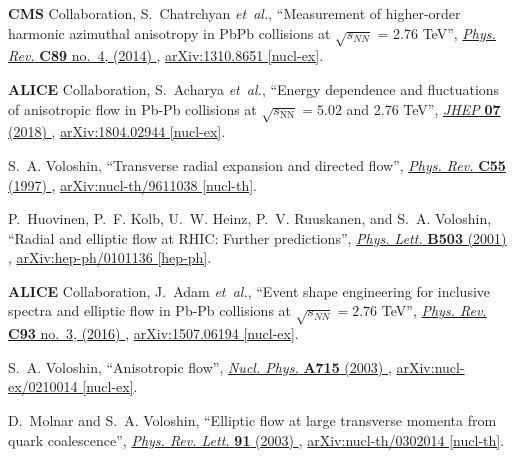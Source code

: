 \documentclass[ALICE,manyauthors]{cernphprep}
\providecommand{\DIFdelend}{} %
\begin{document}
\begin{thebibliography}{10}
\DIFdelend {}
{\bfseries CMS} Collaboration, S.~Chatrchyan {\em et~al.}, ``{Measurement of
  higher-order harmonic azimuthal anisotropy in PbPb collisions at
  $\sqrt{s_{NN}}$ = 2.76 TeV}'',
  \href{http://dx.doi.org/10.1103/PhysRevC.89.044906}{{\em Phys. Rev.}
  {\bfseries C89} no.~4, (2014) },
\href{http://arxiv.org/abs/1310.8651}{{\ttfamily arXiv:1310.8651 [nucl-ex]}}.

{\bfseries ALICE} Collaboration, S.~Acharya {\em et~al.}, ``{Energy dependence
  and fluctuations of anisotropic flow in Pb-Pb collisions at $
  \sqrt{s_{\mathrm{NN}}}=5.02 $ and 2.76 TeV}'',
  \href{http://dx.doi.org/10.1007/JHEP07(2018)103}{{\em JHEP} {\bfseries 07}
  (2018) },
\href{http://arxiv.org/abs/1804.02944}{{\ttfamily arXiv:1804.02944 [nucl-ex]}}.

S.~A. Voloshin, ``{Transverse radial expansion and directed flow}'',
  \href{http://dx.doi.org/10.1103/PhysRevC.55.R1630}{{\em Phys. Rev.}
  {\bfseries C55} (1997) },
\href{http://arxiv.org/abs/nucl-th/9611038}{{\ttfamily arXiv:nucl-th/9611038
  [nucl-th]}}.

P.~Huovinen, P.~F. Kolb, U.~W. Heinz, P.~V. Ruuskanen, and S.~A. Voloshin,
  ``{Radial and elliptic flow at RHIC: Further predictions}'',
  \href{http://dx.doi.org/10.1016/S0370-2693(01)00219-2}{{\em Phys. Lett.}
  {\bfseries B503} (2001) },
\href{http://arxiv.org/abs/hep-ph/0101136}{{\ttfamily arXiv:hep-ph/0101136
  [hep-ph]}}.

{\bfseries ALICE} Collaboration, J.~Adam {\em et~al.}, ``{Event shape
  engineering for inclusive spectra and elliptic flow in Pb-Pb collisions at
  $\sqrt{s_{NN}} = 2.76$ TeV}'',
  \href{http://dx.doi.org/10.1103/PhysRevC.93.034916}{{\em Phys. Rev.}
  {\bfseries C93} no.~3, (2016) },
\href{http://arxiv.org/abs/1507.06194}{{\ttfamily arXiv:1507.06194 [nucl-ex]}}.

S.~A. Voloshin, ``{Anisotropic flow}'',
  \href{http://dx.doi.org/10.1016/S0375-9474(02)01450-1}{{\em Nucl. Phys.}
  {\bfseries A715} (2003) },
\href{http://arxiv.org/abs/nucl-ex/0210014}{{\ttfamily arXiv:nucl-ex/0210014
  [nucl-ex]}}.

D.~Molnar and S.~A. Voloshin, ``{Elliptic flow at large transverse momenta from
  quark coalescence}'',
  \href{http://dx.doi.org/10.1103/PhysRevLett.91.092301}{{\em Phys. Rev. Lett.}
  {\bfseries 91} (2003) },
\href{http://arxiv.org/abs/nucl-th/0302014}{{\ttfamily arXiv:nucl-th/0302014
  [nucl-th]}}.


\end{thebibliography}
\end{document}
